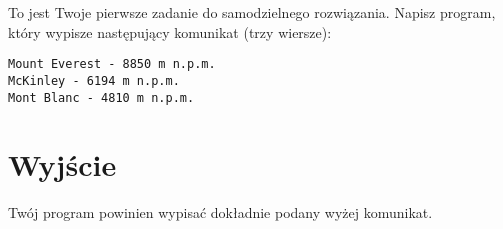 \documentclass{spiral-kurs}
\begin{document}
\makeheader
%
    To jest Twoje pierwsze zadanie do samodzielnego rozwiązania.
    Napisz program, który wypisze następujący komunikat
    (trzy wiersze):

\begin{verbatim}
Mount Everest - 8850 m n.p.m.
McKinley - 6194 m n.p.m.
Mont Blanc - 4810 m n.p.m.
\end{verbatim}
      
    \section{Wyjście}
    Twój program powinien wypisać dokładnie podany wyżej komunikat.


  
\end{document}
